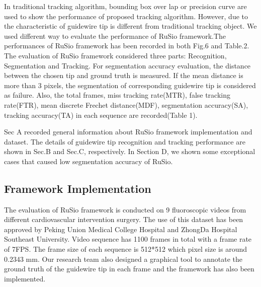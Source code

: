 \documentclass[letterpaper, 10 pt, conference]{ieeeconf}  %
\begin{document}
In traditional tracking algorithm, bounding box over lap \cite{c1} or precision curve \cite{c11} are used to show the performance of proposed tracking algorithm. However, due to the characteristic of guidewire tip is different from traditional tracking object. We used different way to evaluate the performance of RuSio framework.The performances of RuSio framework has been recorded in both Fig.6 and Table.2. The evaluation of RuSio framework considered three parts: Recognition, Segmentation and Tracking. For segmentation accuracy evaluation, the distance between the chosen tip and ground truth is measured. If the mean distance is more than 3 pixels, the segmentation of corresponding guidewire tip is considered as failure. Also, the total frames, miss tracking rate(MTR), false tracking rate(FTR), mean discrete Frechet distance(MDF), segmentation accuracy(SA), tracking accuracy(TA) in each sequence are recorded(Table 1).
\par
Sec A recorded general information about RuSio framework implementation and dataset. The details of guidewire tip recognition and tracking performance are shown in Sec.B and Sec.C, respectively. In Section D, we shown some exceptional cases that caused low segmentation accuracy of RuSio. 


\subsection{Framework Implementation}
The evaluation of RuSio framework is conducted on 9 fluoroscopic videos from different cardiovascular intervention surgery. The use of this dataset has been approved by Peking Union Medical College Hospital and ZhongDa Hospital Southeast University. Video sequence has 1100 frames in total with a frame rate of 7FPS. The frame size of each sequence is 512*512 which pixel size is around 0.2343 mm. Our research team also designed a graphical tool to annotate the ground truth of the guidewire tip in each frame and the framework has also been implemented. 
\end{document}

